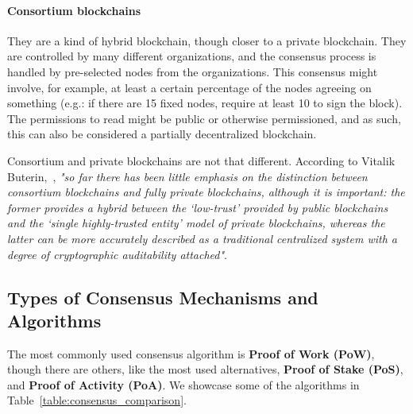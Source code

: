     \paragraph{Consortium blockchains} They are a kind of hybrid blockchain, though closer to a private blockchain. They are controlled by many different organizations, and the consensus process is handled by pre-selected nodes from the organizations. This consensus might involve, for example, at least a certain percentage of the nodes agreeing on something (e.g.: if there are 15 fixed nodes, require at least 10 to sign the block). The permissions to read might be public or otherwise permissioned, and as such, this can also be considered a partially decentralized blockchain.

    Consortium and private blockchains are not that different. According to Vitalik Buterin,~\cite{Buterin2015}, \textit{"so far there has been little emphasis on the distinction between consortium blockchains and fully private blockchains, although it is important: the former provides a hybrid between the ‘low-trust’ provided by public blockchains and the ‘single highly-trusted entity’ model of private blockchains, whereas the latter can be more accurately described as a traditional centralized system with a degree of cryptographic auditability attached"}.
    \subsection{Types of Consensus Mechanisms and Algorithms}
    
     The most commonly used consensus algorithm is \textbf{Proof of Work (PoW)}, though there are others, like the most used alternatives, \textbf{Proof of Stake (PoS)}, and \textbf{Proof of Activity (PoA)}. We showcase some of the algorithms in Table~\ref{table:consensus_comparison}.
    




